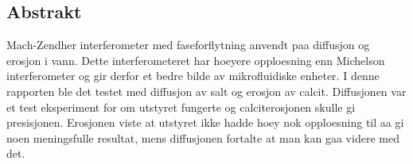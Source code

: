 \subsection {Abstrakt}
  Mach-Zendher interferometer med faseforflytning anvendt paa diffusjon og erosjon
  i vann. Dette interferometeret har hoeyere opploesning enn Michelson interferometer 
  og gir derfor et bedre bilde av mikrofluidiske enheter. I denne rapporten ble 
  det testet med diffusjon av salt og erosjon av calcit. Diffusjonen var et test
  eksperiment for om utstyret fungerte og calciterosjonen skulle gi presisjonen.
  Erosjonen viste at utstyret ikke hadde hoey nok opploesning til aa gi noen
  meningsfulle resultat, mens diffusjonen fortalte at man kan gaa videre med det.
